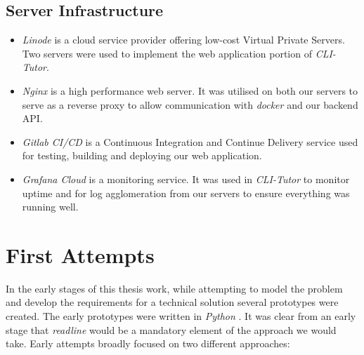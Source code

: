 \subsection{Server Infrastructure}
\begin{itemize}
    \item \textit{Linode} is a cloud service provider offering low-cost Virtual Private Servers. Two servers were used to implement the web application portion of \textit{CLI-Tutor}.
    \item \textit{Nginx} is a high performance web server. It was utilised on
        both our servers to serve as a reverse proxy to allow communication
        with \textit{docker} and our backend API.
    \item \textit{Gitlab CI/CD} is a Continuous Integration and Continue Delivery service used for testing, building and deploying our web application.
    \item \textit{Grafana Cloud} is a monitoring service. It was used in
        \textit{CLI-Tutor} to monitor uptime and for log agglomeration from our
        servers to ensure everything was running well.
\end{itemize}

\section{First Attempts} In the early stages of this thesis work, while
attempting to model the problem and develop the requirements for a technical
solution several prototypes were created. The early prototypes were written
in \textit{Python} \cite{python}. It was clear from an early stage that
\textit{readline} would be a mandatory element of the approach we would take. Early
attempts broadly focused on two different approaches:

